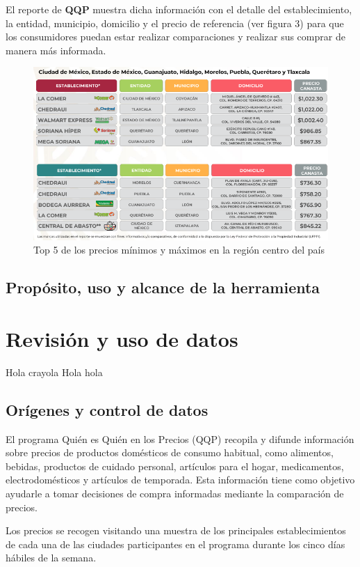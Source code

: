 \documentclass{article}
\begin{document}
\newpage 
El reporte de \textbf{QQP} muestra dicha información con el detalle del establecimiento, la entidad, municipio, domicilio y el precio de referencia (ver figura 3) para que los consumidores puedan estar realizar comparaciones y realizar sus comprar de manera más informada.

\begin{figure}[h]
\centering
\includegraphics[width=0.9\linewidth]{images/Top 5.png}
\caption{\label{fig:Canasta}Top 5 de los precios mínimos y máximos en la región centro del país}
\end{figure}

\subsection{Propósito, uso y alcance de la herramienta}

\section{Revisión y uso de datos}

Hola crayola Hola hola

\subsection{Orígenes y control de datos}

El programa Quién es Quién en los Precios (QQP) recopila y difunde información sobre precios de productos domésticos de consumo habitual, como alimentos, bebidas, productos de cuidado personal, artículos para el hogar, medicamentos, electrodomésticos y artículos de temporada. Esta información tiene como objetivo ayudarle a tomar decisiones de compra informadas mediante la comparación de precios.

Los precios se recogen visitando una muestra de los principales establecimientos de cada una de las ciudades participantes en el programa durante los cinco días hábiles de la semana.
\end{document}

